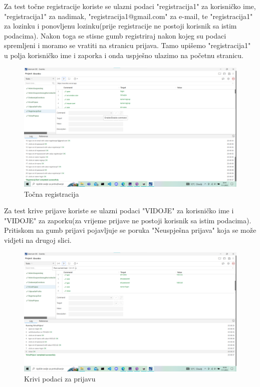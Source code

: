 		 	\indent Za test točne registracije koriste se ulazni podaci "registracija1" za korisničko ime, "registracija1" za nadimak, "registracija1@gmail.com" za e-mail, te "registracija1" za lozinku i ponovljenu lozinku(prije registracije ne postoji korisnik sa istim podacima). Nakon toga se stisne gumb registriraj nakon kojeg su podaci spremljeni i moramo se vratiti na stranicu prijava. Tamo upišemo "registracija1" u polja korisničko ime i zaporka i onda uspješno ulazimo na početnu stranicu.
		 	\begin{figure}[H]
		 		\includegraphics[width=\textwidth]{Slike/RegistracijaTest.png}
		 		\caption{Točna registracija}
		 	\end{figure}
	 	
	 		\indent Za test krive prijave koriste se ulazni podaci "VIDOJE" za korisničko ime i "VIDOJE" za zaporku(za vrijeme prijave ne postoji korisnik sa istim podacima). Pritiskom na gumb prijavi pojavljuje se poruka "Neuspješna prijava" koja se može vidjeti na drugoj slici.
	 		
	 		\begin{figure}[H]
	 			\includegraphics[width=\textwidth]{Slike/KrivaPrijava.png}
	 			\caption{Krivi podaci za prijavu}
	 		\end{figure}
 		
